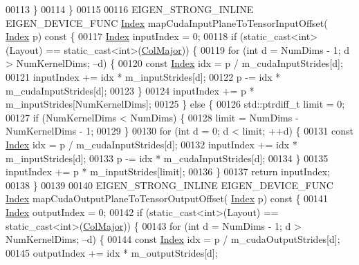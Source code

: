 \begin{DoxyCode}
00113     \}
00114   \}
00115 
00116   EIGEN\_STRONG\_INLINE EIGEN\_DEVICE\_FUNC \hyperlink{namespace_eigen_a62e77e0933482dafde8fe197d9a2cfde}{Index} mapCudaInputPlaneToTensorInputOffset(
      \hyperlink{namespace_eigen_a62e77e0933482dafde8fe197d9a2cfde}{Index} p)\textcolor{keyword}{ const }\{
00117     \hyperlink{namespace_eigen_a62e77e0933482dafde8fe197d9a2cfde}{Index} inputIndex = 0;
00118     \textcolor{keywordflow}{if} (static\_cast<int>(Layout) == static\_cast<int>(\hyperlink{group__enums_ggaacded1a18ae58b0f554751f6cdf9eb13a0cbd4bdd0abcfc0224c5fcb5e4f6669a}{ColMajor})) \{
00119       \textcolor{keywordflow}{for} (\textcolor{keywordtype}{int} d = NumDims - 1; d > NumKernelDims; --d) \{
00120         \textcolor{keyword}{const} \hyperlink{namespace_eigen_a62e77e0933482dafde8fe197d9a2cfde}{Index} idx = p / m\_cudaInputStrides[d];
00121         inputIndex += idx * m\_inputStrides[d];
00122         p -= idx * m\_cudaInputStrides[d];
00123       \}
00124       inputIndex += p * m\_inputStrides[NumKernelDims];
00125     \} \textcolor{keywordflow}{else} \{
00126       std::ptrdiff\_t limit = 0;
00127       \textcolor{keywordflow}{if} (NumKernelDims < NumDims) \{
00128         limit = NumDims - NumKernelDims - 1;
00129       \}
00130       \textcolor{keywordflow}{for} (\textcolor{keywordtype}{int} d = 0; d < limit; ++d) \{
00131         \textcolor{keyword}{const} \hyperlink{namespace_eigen_a62e77e0933482dafde8fe197d9a2cfde}{Index} idx = p / m\_cudaInputStrides[d];
00132         inputIndex += idx * m\_inputStrides[d];
00133         p -= idx * m\_cudaInputStrides[d];
00134       \}
00135       inputIndex += p * m\_inputStrides[limit];
00136     \}
00137     \textcolor{keywordflow}{return} inputIndex;
00138   \}
00139 
00140   EIGEN\_STRONG\_INLINE EIGEN\_DEVICE\_FUNC \hyperlink{namespace_eigen_a62e77e0933482dafde8fe197d9a2cfde}{Index} mapCudaOutputPlaneToTensorOutputOffset(
      \hyperlink{namespace_eigen_a62e77e0933482dafde8fe197d9a2cfde}{Index} p)\textcolor{keyword}{ const }\{
00141     \hyperlink{namespace_eigen_a62e77e0933482dafde8fe197d9a2cfde}{Index} outputIndex = 0;
00142     \textcolor{keywordflow}{if} (static\_cast<int>(Layout) == static\_cast<int>(\hyperlink{group__enums_ggaacded1a18ae58b0f554751f6cdf9eb13a0cbd4bdd0abcfc0224c5fcb5e4f6669a}{ColMajor})) \{
00143       \textcolor{keywordflow}{for} (\textcolor{keywordtype}{int} d = NumDims - 1; d > NumKernelDims; --d) \{
00144         \textcolor{keyword}{const} \hyperlink{namespace_eigen_a62e77e0933482dafde8fe197d9a2cfde}{Index} idx = p / m\_cudaOutputStrides[d];
00145         outputIndex += idx * m\_outputStrides[d];

\end{DoxyCode}

